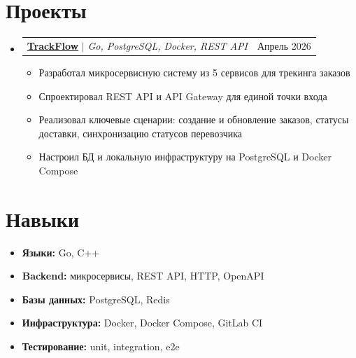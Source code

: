 \documentclass[letterpaper,11pt]{article}
\makeatletter
\newcommand{\resumeItem}[1]{
  \item\small{
    {#1 \vspace{-2pt}}
  }
}
\newcommand{\resumeProjectHeading}[2]{
    \item
    \begin{tabular*}{0.97\textwidth}{l@{\extracolsep{\fill}}r}
      \small#1 & #2 \\
    \end{tabular*}\vspace{-7pt}
}
\newcommand{\resumeSubHeadingListStart}{\begin{itemize}[leftmargin=0.15in, label={}]}
\newcommand{\resumeSubHeadingListEnd}{\end{itemize}}
\newcommand{\resumeItemListStart}{\begin{itemize}}
\newcommand{\resumeItemListEnd}{\end{itemize}\vspace{-5pt}}
\makeatother
\begin{document}
\section{Проекты}
    \resumeSubHeadingListStart
      \resumeProjectHeading
        {\textbf{\href{https://github.com/int28t/trackflow}{TrackFlow}} $|$ \emph{Go, PostgreSQL, Docker, REST API}}{Апрель 2026}
        \resumeItemListStart
          \resumeItem{Разработал микросервисную систему из 5 сервисов для трекинга заказов}
          \resumeItem{Спроектировал REST API и API Gateway для единой точки входа}
          \resumeItem{Реализовал ключевые сценарии: создание и обновление заказов, статусы доставки, синхронизацию статусов перевозчика}
          \resumeItem{Настроил БД и локальную инфраструктуру на PostgreSQL и Docker Compose}
        \resumeItemListEnd
    \resumeSubHeadingListEnd


\section{Навыки}
\begin{itemize}[itemsep=2pt, topsep=2pt]
    \item \textbf{Языки:} Go, C++
    \item \textbf{Backend:} микросервисы, REST API, HTTP, OpenAPI
    \item \textbf{Базы данных:} PostgreSQL, Redis
    \item \textbf{Инфраструктура:} Docker, Docker Compose, GitLab CI
    \item \textbf{Тестирование:} unit, integration, e2e
\end{itemize}
\end{document}

